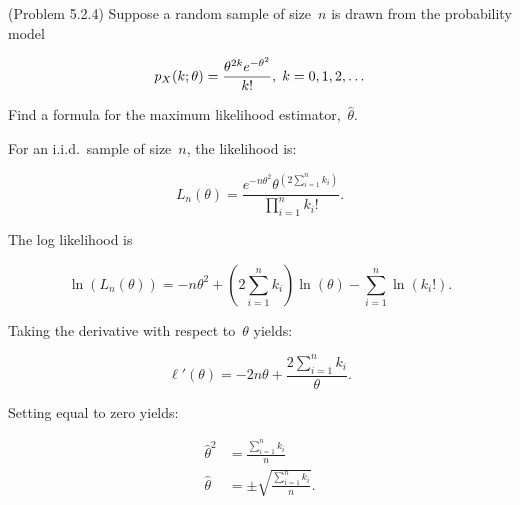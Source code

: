 \begin{problem}
  (\textnormal{Problem 5.2.4}) Suppose a random sample of size~$n$ is drawn from the probability model

  \begin{equation}\label{eq:P03:Distr}
    p_{X}(k;\theta) = \frac{\theta^{2k} e^{-\theta^2}}{k!}, \hspace{0.1cm}k=0,1,2,\ldots
  \end{equation}

  \noindent
  Find a formula for the maximum likelihood estimator,~$\hat{\theta}$.
\end{problem}

For an i.i.d.\ sample of size~$n$, the likelihood is:

\begin{equation}\label{eq:P03:Likelihood}
  L_{n}(\theta) = \frac{e^{-n\theta^{2}} \theta^{\left(2\sum_{i=1}^{n} k_i\right)}}{\prod_{i=1}^{n} k_i !}\text{.}
\end{equation}

\noindent
The log likelihood is

\begin{equation}\label{eq:P03:LogLikelihood}
  \ln\left(L_{n}(\theta)\right) = -n\theta^{2} + {\left(2\sum_{i=1}^{n} k_i\right)} \ln\left(\theta\right) - \sum_{i=1}^{n} \ln\left(k_{i}!\right) \text{.}
\end{equation}

\noindent
Taking the derivative with respect to~$\theta$ yields:

\begin{equation}\label{eq:P03:LogLikelihood:Deriv}
  \ell'(\theta) = -2n\theta + \frac{2\sum_{i=1}^{n} k_i}{\theta}\text{.}
\end{equation}

\noindent
Setting equal to zero yields:

\begin{align}
  \hat{\theta}^{2} &= \frac{\sum_{i=1}^{n} k_i}{n} \\
  \hat{\theta} &= \pm \sqrt{\frac{\sum_{i=1}^{n} k_i}{n}} \text{.}
\end{align}
